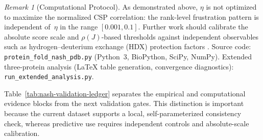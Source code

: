 \documentclass[12pt,a4paper]{article}
\theoremstyle{remark}
\newtheorem{remark}{Remark}
\begin{document}
\begin{remark}[Computational Protocol]
As demonstrated above, $\eta$ is not optimized to maximize the normalized CSP correlation: the rank-level frustration pattern is independent of~$\eta$ in the range $[0.001, 0.1]$. Further work should calibrate the absolute score scale and $\rho(J)$-based thresholds against independent observables such as hydrogen--deuterium exchange (HDX) protection factors \citep{McKnight1996}.
Source code: \texttt{protein\_fold\_nash\_pdb.py} (Python~3, BioPython, SciPy, NumPy).
Extended three-protein analysis (LaTeX table generation, convergence diagnostics): \texttt{run\_extended\_analysis.py}.
\end{remark}

Table~\ref{tab:nash-validation-ledger} separates the empirical and computational evidence blocks from the next validation gates. This distinction is important because the current dataset supports a local, self-parameterized consistency check, whereas predictive use requires independent controls and absolute-scale calibration.
\end{document}
